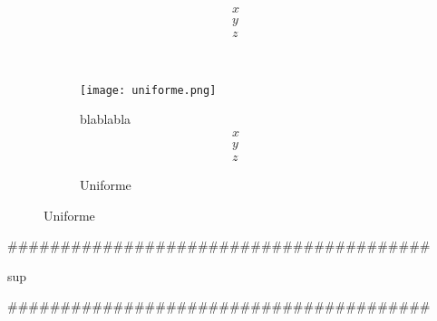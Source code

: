 \begin{figure}[H]
\begin{subfigure}[t]{.5\textwidth}
\begin{equation}
		\begin{matrix}
		x\\
		y\\
		z
		\end{matrix}
		\end{equation}
	\end{subfigure}\ \ \ \ 
\begin{subfigure}[t]{.5\textwidth}
		\texttt{[image: uniforme.png]}\caption{Uniforme}
		blablabla
		\begin{equation}
		\begin{matrix}
		x\\
		y\\
		z
		\end{matrix}
		\end{equation}
	\end{subfigure}
\end{figure}
\#\#\#\#\#\#\#\#\#\#\#\#\#\#\#\#\#\#\#\#\#\#\#\#\#\#\#\#\#\#\#\#\#\#\#\#\#\#\#\#
\begin{center}sup\end{center}

\#\#\#\#\#\#\#\#\#\#\#\#\#\#\#\#\#\#\#\#\#\#\#\#\#\#\#\#\#\#\#\#\#\#\#\#\#\#\#\#\\